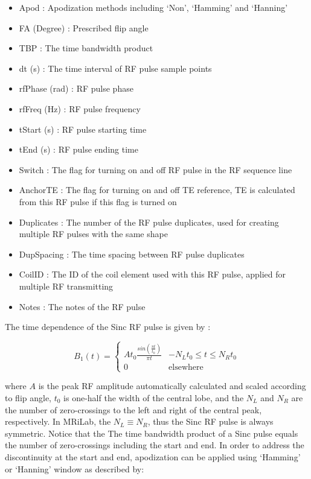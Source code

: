 \documentclass{book}%
\begin{document}
\begin{itemize}
	\item Apod : Apodization methods including `Non', `Hamming' and `Hanning'
	\item FA (Degree) : Prescribed flip angle 
	\item TBP : The time bandwidth product
	\item dt (s) : The time interval of RF pulse sample points
	\item rfPhase (rad) : RF pulse phase
	\item rfFreq (Hz) : RF pulse frequency
	\item tStart (s) : RF pulse starting time
	\item tEnd (s) : RF pulse ending time
	\item Switch : The flag for turning on and off RF pulse in the RF sequence line
	\item AnchorTE : The flag for turning on and off TE reference, TE is calculated from this RF pulse if this flag is turned on
	\item Duplicates : The number of the RF pulse duplicates, used for creating multiple RF pulses with the same shape
	\item DupSpacing : The time spacing between RF pulse duplicates
	\item CoilID : The ID of the coil element used with this RF pulse, applied for multiple RF transmitting
	\item Notes : The notes of the RF pulse 
\end{itemize}

The time dependence of the Sinc RF pulse is given by \cite{Handbook2004}:

\begin{equation}
B_1(t) = 
\begin{cases}
 A t_0 \frac{sin(\frac{\pi t}{t_0})}{\pi t} &  -N_L t_0 \leq t \leq N_R t_0 \\
 0                                          &  \text{elsewhere}
\end{cases}
\label{eq:Sinc}
\end{equation}

where $A$ is the peak RF amplitude automatically calculated and scaled according to flip angle, $t_0$ is one-half the width of the central lobe, and the $N_L$ and $N_R$ are the number of zero-crossings to the left and right of the central peak, respectively. In MRiLab, the $N_L \equiv N_R$, thus the Sinc RF pulse is always symmetric. Notice that the The time bandwidth product of a Sinc pulse equals the number of zero-crossings including the start and end. In order to address the discontinuity at the start and end, apodization can be applied using `Hamming' or `Hanning' window as described by:
\end{document}
